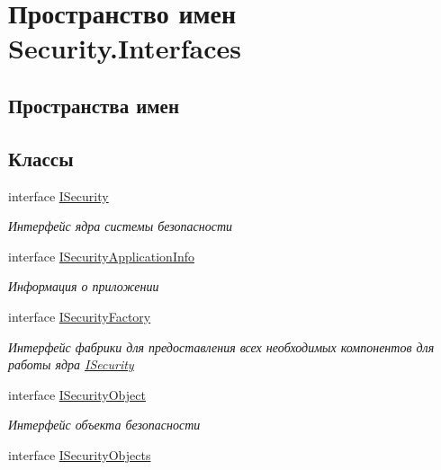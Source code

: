 \hypertarget{namespace_security_1_1_interfaces}{}\section{Пространство имен Security.\+Interfaces}
\label{namespace_security_1_1_interfaces}
\subsection*{Пространства имен}
\begin{DoxyCompactItemize}
\end{DoxyCompactItemize}
\subsection*{Классы}
\begin{DoxyCompactItemize}
\item 
interface \hyperlink{interface_security_1_1_interfaces_1_1_i_security}{I\+Security}
\begin{DoxyCompactList}\small\item\em Интерфейс ядра системы безопасности \end{DoxyCompactList}\item 
interface \hyperlink{interface_security_1_1_interfaces_1_1_i_security_application_info}{I\+Security\+Application\+Info}
\begin{DoxyCompactList}\small\item\em Информация о приложении \end{DoxyCompactList}\item 
interface \hyperlink{interface_security_1_1_interfaces_1_1_i_security_factory}{I\+Security\+Factory}
\begin{DoxyCompactList}\small\item\em Интерфейс фабрики для предоставления всех необходимых компонентов для работы ядра \hyperlink{interface_security_1_1_interfaces_1_1_i_security}{I\+Security} \end{DoxyCompactList}\item 
interface \hyperlink{interface_security_1_1_interfaces_1_1_i_security_object}{I\+Security\+Object}
\begin{DoxyCompactList}\small\item\em Интерфейс объекта безопасности \end{DoxyCompactList}\item 
interface \hyperlink{interface_security_1_1_interfaces_1_1_i_security_objects}{I\+Security\+Objects}

\end{DoxyCompactItemize}
